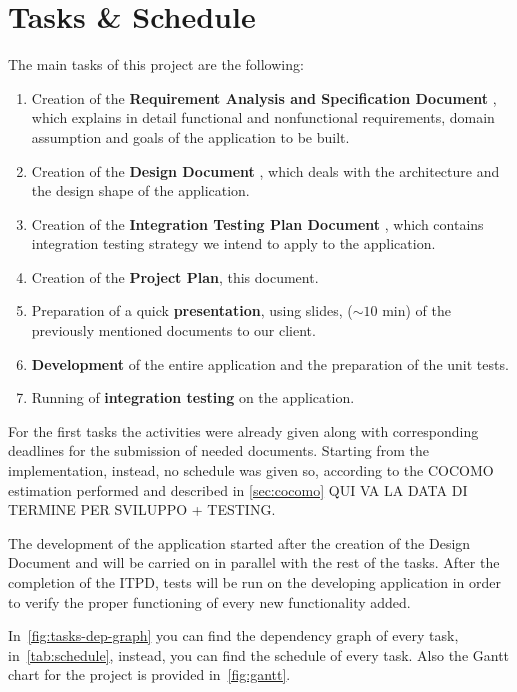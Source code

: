\section{Tasks \& Schedule}

The main tasks of this project are the following:
\begin{enumerate}
    \item Creation of the \textbf{Requirement Analysis and Specification Document} \cite{bib:rasd}, which explains in detail functional and nonfunctional requirements, domain assumption and goals of the application to be built.
    \item Creation of the \textbf{Design Document} \cite{bib:dd}, which deals with the architecture and the design shape of the application.
    \item Creation of the \textbf{Integration Testing Plan Document} \cite{bib:itpd}, which contains integration testing strategy we intend to apply to the application.
    \item Creation of the \textbf{Project Plan}, this document.
    \item Preparation of a quick \textbf{presentation}, using slides, ($\sim 10$ min) of the previously mentioned documents to our client.
    \item \textbf{Development} of the entire application and the preparation of the unit tests.
    \item Running of \textbf{integration testing} on the application.
\end{enumerate}

For the first tasks the activities were already given along with corresponding deadlines for the submission of needed documents. Starting from the implementation, instead, no schedule was given so, according to the COCOMO estimation performed and described in \ref{sec:cocomo} QUI VA LA DATA DI TERMINE PER SVILUPPO + TESTING. %

The development of the application started after the creation of the Design Document and will be carried on in parallel with the rest of the tasks.
After the completion of the ITPD, tests will be run on the developing application in order to verify the proper functioning of every new functionality added.

In~\autoref{fig:tasks-dep-graph} you can find the dependency graph of every task, in~\autoref{tab:schedule}, instead, you can find the schedule of every task. Also the Gantt chart for the project is provided in~\autoref{fig:gantt}.


